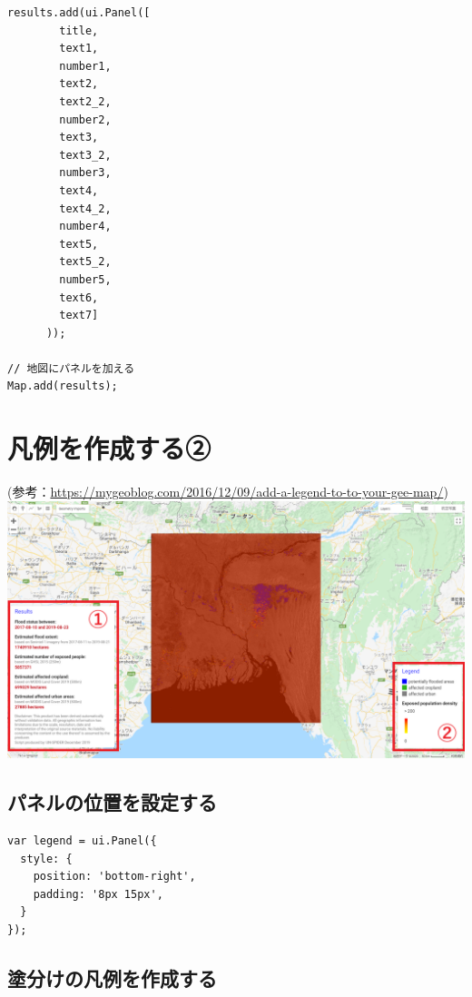 \documentclass[
]{book}
\begin{document}
\begin{verbatim}
results.add(ui.Panel([
        title,
        text1,
        number1,
        text2,
        text2_2,
        number2,
        text3,
        text3_2,
        number3,
        text4,
        text4_2,
        number4,
        text5,
        text5_2,
        number5,
        text6,
        text7]
      ));

// 地図にパネルを加える 
Map.add(results);
\end{verbatim}

\hypertarget{ux51e1ux4f8bux3092ux4f5cux6210ux3059ux308bux2461}{%
\section{凡例を作成する②}\label{ux51e1ux4f8bux3092ux4f5cux6210ux3059ux308bux2461}}

(参考：\url{https://mygeoblog.com/2016/12/09/add-a-legend-to-to-your-gee-map/})\\
\includegraphics{images/example1.png}

\hypertarget{ux30d1ux30cdux30ebux306eux4f4dux7f6eux3092ux8a2dux5b9aux3059ux308b}{%
\subsection{パネルの位置を設定する}\label{ux30d1ux30cdux30ebux306eux4f4dux7f6eux3092ux8a2dux5b9aux3059ux308b}}

\begin{verbatim}
var legend = ui.Panel({
  style: {
    position: 'bottom-right',
    padding: '8px 15px',
  }
});
\end{verbatim}

\hypertarget{ux5857ux5206ux3051ux306eux51e1ux4f8bux3092ux4f5cux6210ux3059ux308b}{%
\subsection{塗分けの凡例を作成する}\label{ux5857ux5206ux3051ux306eux51e1ux4f8bux3092ux4f5cux6210ux3059ux308b}}
\end{document}
